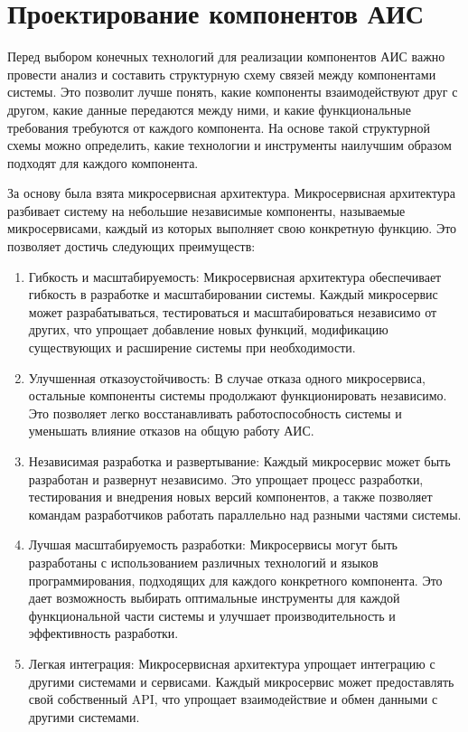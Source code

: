 \section{Проектирование компонентов АИС}
Перед выбором конечных технологий для реализации компонентов АИС важно провести анализ 
и составить структурную схему связей между компонентами системы. 
Это позволит лучше понять, какие компоненты взаимодействуют друг с другом, 
какие данные передаются между ними, и какие функциональные требования требуются от каждого компонента. 
На основе такой структурной схемы можно определить, 
какие технологии и инструменты наилучшим образом подходят для каждого компонента.

За основу была взята микросервисная архитектура. 
Микросервисная архитектура разбивает систему на небольшие независимые компоненты, 
называемые микросервисами, каждый из которых выполняет свою конкретную функцию. 
Это позволяет достичь следующих преимуществ:

\begin{enumerate}
  \item Гибкость и масштабируемость: Микросервисная архитектура обеспечивает гибкость в разработке и масштабировании системы. 
  Каждый микросервис может разрабатываться, тестироваться и масштабироваться независимо от других, 
  что упрощает добавление новых функций, модификацию существующих и расширение системы при необходимости.
  \item Улучшенная отказоустойчивость: В случае отказа одного микросервиса, 
  остальные компоненты системы продолжают функционировать независимо. 
  Это позволяет легко восстанавливать работоспособность системы и 
  уменьшать влияние отказов на общую работу АИС.
  \item Независимая разработка и развертывание: Каждый микросервис может быть разработан 
  и развернут независимо. Это упрощает процесс разработки, тестирования и 
  внедрения новых версий компонентов, а также позволяет командам разработчиков 
  работать параллельно над разными частями системы.
  \item Лучшая масштабируемость разработки: Микросервисы могут быть разработаны с 
  использованием различных технологий и языков программирования, подходящих для каждого 
  конкретного компонента. Это дает возможность выбирать оптимальные инструменты для 
  каждой функциональной части системы и улучшает производительность и эффективность разработки.
  \item Легкая интеграция: Микросервисная архитектура упрощает интеграцию с другими 
  системами и сервисами. Каждый микросервис может предоставлять свой собственный API, 
  что упрощает взаимодействие и обмен данными с другими системами.
\end{enumerate}

